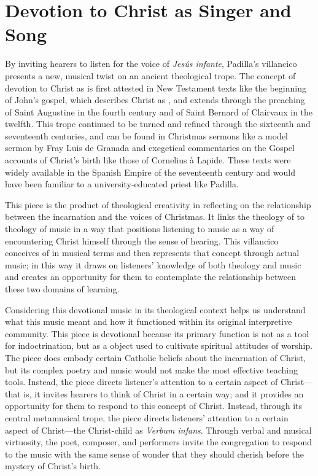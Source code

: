 \section{Devotion to Christ as Singer and Song}

By inviting hearers to listen for the voice of \emph{Jesús infante}, Padilla's
villancico presents a new, musical twist on an ancient theological trope.
The concept of devotion to Christ as  is first attested
in New Testament texts like the beginning of John's gospel, which describes
Christ as , and extends through the preaching of
Saint Augustine in the fourth century and of Saint Bernard of Clairvaux in the
twelfth.
This trope continued to be turned and refined through the sixteenth and
seventeenth centuries, and can be found in Christmas sermons like a model sermon
by Fray Luis de Granada and exegetical commentaries on the Gospel accounts of
Christ's birth like those of Cornelius à Lapide.
These texts were widely available in the Spanish Empire of the seventeenth
century and would have been familiar to a university-educated priest like
Padilla.

This piece is the product of theological creativity in reflecting on the
relationship between the incarnation and the voices of Christmas. 
It links the theology of  to theology of music in a way that
positions listening to music as a way of encountering Christ himself through the
sense of hearing.
This villancico conceives of  in musical terms and then
represents that concept through actual music; in this way it draws on listeners'
knowledge of both theology and music and creates an opportunity for them to
contemplate the relationship between these two domains of learning.

Considering this devotional music in its theological context helps us understand
what this music meant and how it functioned within its original interpretive
community.
This piece is devotional because its primary function is not as a tool for
indoctrination, but as a object used to cultivate spiritual attitudes of
worship.
The piece does embody certain Catholic beliefs about the incarnation of Christ,
but its complex poetry and music would not make the most effective teaching
tools.
Instead, the piece directs listener's attention to a certain aspect of
Christ---that is, it invites hearers to think of Christ in a certain way; and it
provides an opportunity for them to respond to this concept of Christ.
Instead, through its central metamusical trope, the piece directs listeners'
attention to a certain aspect of Christ---the Christ-child as \emph{Verbum
infans}.
Through verbal and musical virtuosity, the poet, composer, and performers invite
the congregation to respond to the music with the same sense of wonder that they
should cherish before the mystery of Christ's birth.

